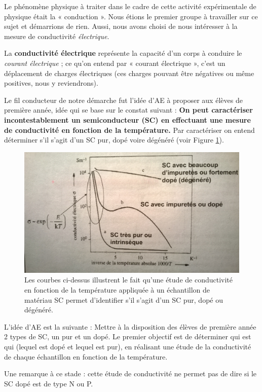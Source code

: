 \label{objectifs}
Le phénomène physique à traiter dans le cadre de cette activité expérimentale de physique était la « conduction ». 
Nous étions le premier groupe à travailler sur ce sujet et démarrions de rien. 
Aussi, nous avons choisi de nous intéresser à la mesure de conductivité \textit{électrique}.

La \textbf{conductivité électrique} représente la capacité d'un corps à conduire le \textit{courant électrique} ; 
ce qu'on entend par « courant électrique », c'est un déplacement de charges électriques 
(ces charges pouvant être négatives ou même positives, nous y reviendrons).

\bigskip
Le fil conducteur de notre démarche fut l'idée d'AE à proposer aux élèves de première année, 
idée qui se base sur le constat suivant :
\textbf{On peut caractériser incontestablement un semiconducteur (SC) en effectuant 
une mesure de conductivité en fonction de la température.}
Par caractériser on entend déterminer s'il s'agit d'un SC pur, dopé voire dégénéré (voir Figure \ref{conduc}).

\begin{figure}
  \centering
  \includegraphics[width=12cm]{./images/conductivite.jpg}
  \caption{Les courbes ci-dessus illustrent le fait
  qu'une étude de conductivité en fonction de la température appliquée à un échantillon de matériau SC
  permet d'identifier s'il s'agit d'un SC pur, dopé ou dégénéré.}
  \label{conduc}
\end{figure}

\bigskip
L'idée d'AE est la suivante :
Mettre à la disposition des élèves de première année 2 types de SC, un pur et un dopé. 
Le premier objectif est de déterminer qui est qui (lequel est dopé et lequel est pur), 
en réalisant une étude de la conductivité de chaque échantillon 
en fonction de la température.

Une remarque à ce stade : cette étude de conductivité ne permet pas de dire si le SC dopé est de type N ou P.


